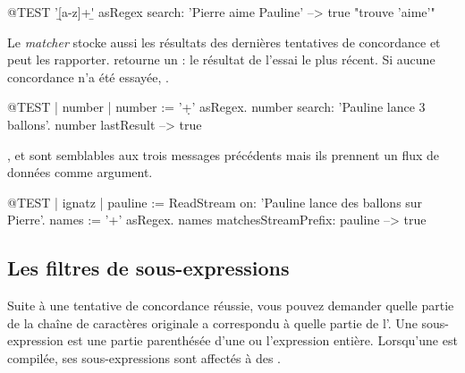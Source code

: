 \documentclass[a4paper,10pt,twoside]{book}
\begin{document}
{\begin{code}{@TEST}
'\b[a-z]+\b' asRegex search: 'Pierre aime Pauline' --> true    "trouve 'aime'"
\end{code}

Le \emph{matcher} stocke aussi les résultats des dernières tentatives
de concordance et peut les rapporter.
 retourne un : le résultat
de l'essai le plus récent. Si aucune concordance n'a été essayée, .

\begin{code}{@TEST | number |}
number := '\d+' asRegex.
number search: 'Pauline lance 3 ballons'.
number lastResult --> true
\end{code}

,
 et
 sont semblables aux trois messages
précédents mais ils prennent un flux de données comme argument.

\begin{code}{@TEST | ignatz |}
pauline := ReadStream on: 'Pauline lance des ballons sur Pierre'.
names := '\<[A-Z][a-z]+\>' asRegex.
names matchesStreamPrefix: pauline --> true
\end{code}

\subsection{Les filtres de sous-expressions}

Suite à une tentative de concordance réussie, vous pouvez demander
quelle partie de la chaîne de caractères originale a correspondu à
quelle partie de l'\expreg. Une sous-expression est une partie
parenthésée d'une \expreg ou l'expression entière.
Lorsqu'une \expreg est compilée, ses sous-expressions sont affectés à
des . 

}
\end{document}
